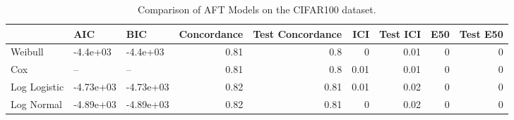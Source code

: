 \begin{table*}
\centering
\caption{Comparison of AFT Models on the CIFAR100 dataset.}
\label{tab:cifar100}
\begin{tabular}{lllrrrrrr}
\toprule
 & AIC & BIC & Concordance & Test Concordance & ICI & Test ICI & E50 & Test E50 \\
\midrule
Weibull & -4.4e+03 & -4.4e+03 & 0.81 & 0.8 & 0 & 0.01 & 0 & 0 \\
Cox & -- & -- & 0.81 & 0.8 & 0.01 & 0.01 & 0 & 0 \\
Log Logistic & -4.73e+03 & -4.73e+03 & 0.82 & 0.81 & 0.01 & 0.02 & 0 & 0 \\
Log Normal & -4.89e+03 & -4.89e+03 & 0.82 & 0.81 & 0 & 0.02 & 0 & 0 \\
\bottomrule
\end{tabular}
\end{table*}
